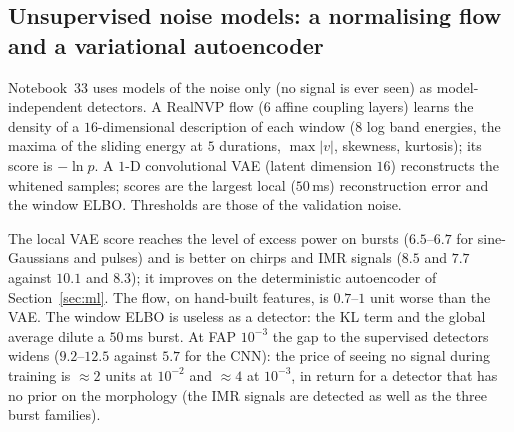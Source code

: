 \subsection{Unsupervised noise models: a normalising flow and a variational autoencoder}\label{sec:flowvae}
Notebook~33 uses models of the noise only (no signal is ever seen) as model-independent detectors. A RealNVP flow ($6$ affine coupling layers) learns the density of a $16$-dimensional description of each window ($8$ log band energies, the maxima of the sliding energy at $5$ durations, $\max|v|$, skewness, kurtosis); its score is $-\ln p$. A $1$-D convolutional VAE (latent dimension $16$) reconstructs the whitened samples; scores are the largest local ($50\,$ms) reconstruction error and the window ELBO. Thresholds are those of the validation noise.
\begin{table}[h]\centering\small
{}
\caption{$\snr_{50}$ at FAP $10^{-2}$ of the unsupervised detectors (IMR: held-out IMRPhenomD library; $^\ast$ network trained with IMR signals).}\label{tab:unsup}
\end{table}
The local VAE score reaches the level of excess power on bursts ($6.5$--$6.7$ for sine-Gaussians and pulses) and is better on chirps and IMR signals ($8.5$ and $7.7$ against $10.1$ and $8.3$); it improves on the deterministic autoencoder of Section~\ref{sec:ml}. The flow, on hand-built features, is $0.7$--$1$ unit worse than the VAE. The window ELBO is useless as a detector: the KL term and the global average dilute a $50\,$ms burst. At FAP $10^{-3}$ the gap to the supervised detectors widens ($9.2$--$12.5$ against $5.7$ for the CNN): the price of seeing no signal during training is $\approx2$ units at $10^{-2}$ and $\approx4$ at $10^{-3}$, in return for a detector that has no prior on the morphology (the IMR signals are detected as well as the three burst families).
